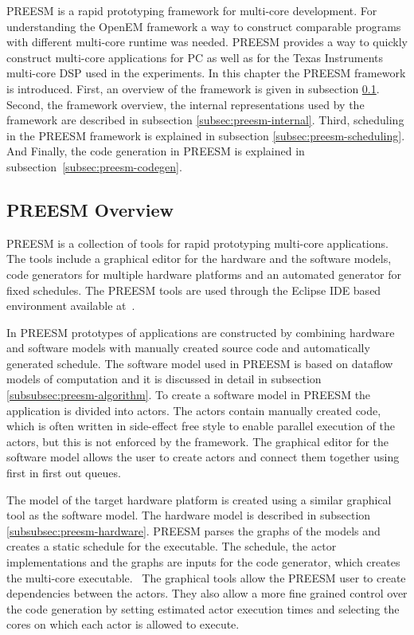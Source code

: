 PREESM is a rapid prototyping framework for multi-core development. For understanding the OpenEM framework a way to construct comparable programs with different multi-core runtime was needed. PREESM provides a way to quickly construct multi-core applications for PC as well as for the Texas Instruments multi-core DSP used in the experiments. In this chapter the PREESM framework is introduced. First, an overview of the framework is given in subsection \ref{subsec:preesm-overview}. Second, the framework overview, the internal representations used by the framework are described in subsection \ref{subsec:preesm-internal}. Third, scheduling in the PREESM framework is explained in subsection \ref{subsec:preesm-scheduling}. And Finally, the code generation in PREESM is explained in subsection~\ref{subsec:preesm-codegen}.

\subsection{PREESM Overview}
\label{subsec:preesm-overview}
PREESM is a collection of tools for rapid prototyping multi-core applications. The tools include a graphical editor for the hardware and the software models, code generators for multiple hardware platforms and an automated generator for fixed schedules. The PREESM tools are used through the Eclipse IDE based environment available at~\cite{preesm}.

In PREESM prototypes of applications are constructed by combining hardware and software models with manually created source code and automatically generated schedule. The software model used in PREESM is based on dataflow models of computation and it is discussed in detail in subsection \ref{subsubsec:preesm-algorithm}. To create a software model in PREESM the application is divided into actors. The actors contain manually created code, which is often written in side-effect free style to enable parallel execution of the actors, but this is not enforced by the framework. The graphical editor for the software model allows the user to create actors and connect them together using first in first out queues.~\cite{preesm}

The model of the target hardware platform is created using a similar graphical tool as the software model. The hardware model is described in subsection \ref{subsubsec:preesm-hardware}. PREESM parses the graphs of the models and creates a static schedule for the executable. The schedule, the actor implementations and the graphs are inputs for the code generator, which creates the multi-core executable.~\cite{pelcat2014preesm} The graphical tools allow the PREESM user to create dependencies between the actors. They also allow a more fine grained control over the code generation by setting estimated actor execution times and selecting the cores on which each actor is allowed to execute.

